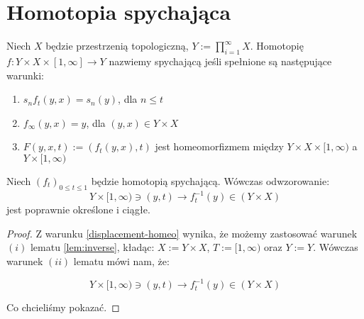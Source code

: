 \section{Homotopia spychająca}
\begin{df}
  Niech $X$ będzie przestrzenią topologiczną, $Y := \prod_{i=1}^\infty X$. Homotopię $f: Y \times X \times [1,\infty] \rightarrow Y$ nazwiemy spychającą jeśli spełnione są następujące warunki:
  \begin{enumerate}
    \item \label{displacement-proj} $s_n f_t(y,x) = s_n(y)$, dla $n \leq t$
    \item \label{displacement-infty} $f_\infty(y,x) = y$, dla $(y,x) \in Y \times X$
    \item \label{displacement-homeo} $F(y,x,t) := (f_t(y,x), t)$ jest homeomorfizmem między $Y \times X \times [1,\infty)$ a $Y \times [1,\infty)$
  \end{enumerate}
\end{df}

\begin{lem}
  Niech $(f_t)_{0 \leq t \leq 1}$ będzie homotopią spychającą. Wówczas odwzorowanie:
  \[Y \times [1,\infty) \ni (y, t) \rightarrow f_t^{-1}(y) \in (Y \times X)\]
  jest poprawnie określone i ciągłe.
  
  \begin{proof}
    Z warunku \ref{displacement-homeo} wynika, że możemy zastosować warunek $(i)$ lematu \ref{lem:inverse}, kładąc: $X := Y \times X$, $T := [1, \infty)$ oraz $Y := Y$. Wówczas warunek $(ii)$ lematu mówi nam, że:
    
    \[Y \times [1,\infty) \ni (y, t) \rightarrow f_t^{-1}(y) \in (Y \times X)\]
    
    Co chcieliśmy pokazać.
  \end{proof}
\end{lem}

